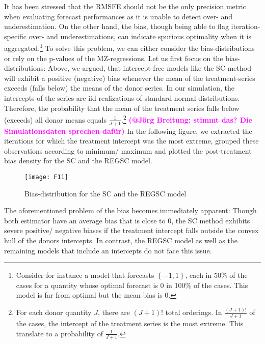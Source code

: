 It has been stressed that the \ac{RMSFE} should not be the only precision metric when evaluating  forecast performances as it is unable to detect over- and underestimation. On the other hand, the bias, though being able to flag iteration-specific over- and underestimations, can indicate spurious optimality when it is aggregated.\footnote{Consider for instance a model that forecasts $\left\lbrace -1,1\right\rbrace $, each in 50\% of the cases for a quantity whose optimal forecast is 0 in 100\% of the cases. This model is far from optimal but the mean bias is 0. } To solve this problem, we can either consider the bias-distributions or rely on the p-values of the \ac{MZ}-regressions. Let us first focus on the bias-distributions: Above, we argued, that intercept-free models like the \ac{SC}-method will exhibit a positive (negative) bias whenever the mean of the treatment-series exceeds (falls below) the means of the donor series. In our simulation, the intercepts of the series are \ac{iid} realizations of standard normal distributions. Therefore, the probability that the mean of the treatment series falls below (exceeds) all donor means equals $\frac{1}{J+1}$.\footnote{For each donor quantity $J$, there are $(J+1)!$ total orderings. In $\frac{(J+1)!}{J+1}$ of the cases, the intercept of the treatment series is the most extreme. This translate to a probability of $\frac{1}{J+1}$. } \textcolor{magenta}{\textbf{(@Jörg Breitung: stimmt das? Die Simulationsdaten sprechen dafür)}} In the following figure, we extracted the iterations for which the treatment intercept was the most extreme, grouped these observations according to minimum/ maximum and plotted the post-treatment bias density for the \ac{SC} and the \ac{REGSC} model. 
\begin{figure}[H]
	\centering
	\texttt{[image: F11]}
	\caption{Bias-distribution for the SC and the REGSC model}
	\label{F_09}
\end{figure}

The aforementioned problem of the bias becomes immediately apparent: Though both estimator have an average bias that is close to 0, the \ac{SC} method exhibits severe positive/ negative biases if the 
treatment intercept falls outside the convex hull of the donors intercepts. In contrast, the \ac{REGSC} model as well as the remaining models that include an intercepts do not face this issue. 


